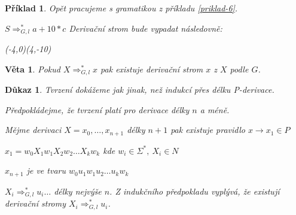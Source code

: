 \documentclass[10pt, a4paper, titlepage]{article}
\theoremstyle{note}
\newtheorem{dukaz}{Důkaz}
\newtheorem{veta}{Věta}
\newtheorem{priklad}{Příklad}
\begin{document}
\begin{priklad}
Opět pracujeme s gramatikou z příkladu \ref{priklad-6}.

$S \Rightarrow_{G,l}^* a+10*c$ \quad Derivační strom bude vypadat následovně:

\begin{center}
\begin{VCPicture}{(-4,0)(4,-10)}
\MediumState
{}

\end{VCPicture}
\end{center}
\end{priklad}

\begin{veta}
Pokud $X \Rightarrow_{G,l}^* x$ pak existuje derivační strom $x$ z $X$ podle $G$.
\end{veta}
\begin{dukaz}
Tvrzení dokážeme jak jinak, než indukcí přes délku P-derivace.

Předpokládejme, že tvrzení platí pro derivace délky $n$ a méně.

Mějme derivaci $X=x_0,\ldots,x_{n+1}$ délky $n+1$ pak existuje pravidlo $x \rightarrow x_1 \in P$

$x_1=w_0X_1w_1X_2w_2 \ldots X_kw_k$ kde $w_i \in \Sigma^*,\ X_i\in N$

$x_{n+1}$ je ve tvaru $w_0u_1w_1u_2\ldots u_kw_k$

$X_i \Rightarrow_{G,l}^* u_i \ldots$ délky nejvýše $n$. Z indukčního předpokladu vyplývá, že existují derivační stromy $X_i \Rightarrow_{G,l}^* u_i$.
\end{dukaz}
\end{document}
